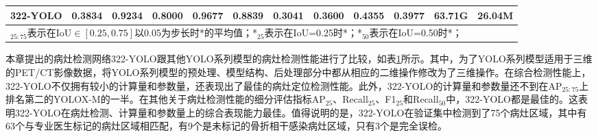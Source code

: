 \begin{table}[htbp]
{\begin{tabular}{lccccccccccc}
            322-YOLO & \textbf{0.3834} & \textbf{0.9234} & 0.8000             & \textbf{0.9677} & \textbf{0.8839} & 0.3041          & 0.3600             & \textbf{0.4355} & 0.3977          & 63.71G  & 26.04M  \\
            \bottomrule
            \multicolumn{12}{l}{\footnotesize *\(_{25:75}\)表示在IoU\(\in [0.25,0.75]\)以0.05为步长时*的平均值；*\(_{25}\)表示在IoU=0.25时*；*\(_{50}\)表示在IoU=0.50时*；}
        \end{tabular}
    }
    \label{tab:chao04_experiment_yolo}
\end{table}

本章提出的病灶检测网络322-YOLO跟其他YOLO系列模型的病灶检测性能进行了比较，如表\ref{tab:chao04_experiment_yolo}所示。其中，为了YOLO系列模型适用于三维的PET/CT影像数据，将YOLO系列模型的预处理、模型结构、后处理部分中都从相应的二维操作修改为了三维操作。在综合检测性能上，322-YOLO不仅拥有较小的计算量和参数量，还表现出了最佳的病灶定位检测性能。此外，322-YOLO的计算量和参数量还不到在AP\(_{25:75}\)上排名第二的YOLOX-M的一半。在其他关于病灶检测性能的细分评估指标AP\(_{25}\)、Recall\(_{25}\)、F1\(_{25}\)和Recall\(_{50}\)中，322-YOLO都是最佳的。这表明322-YOLO在病灶检测、计算量和参数量上的综合表现能力最佳。值得说明的是，322-YOLO在验证集中检测到了75个病灶区域，其中有63个与专业医生标记的病灶区域相匹配，有9个是未标记的骨折相干感染病灶区域，只有3个是完全误检。

